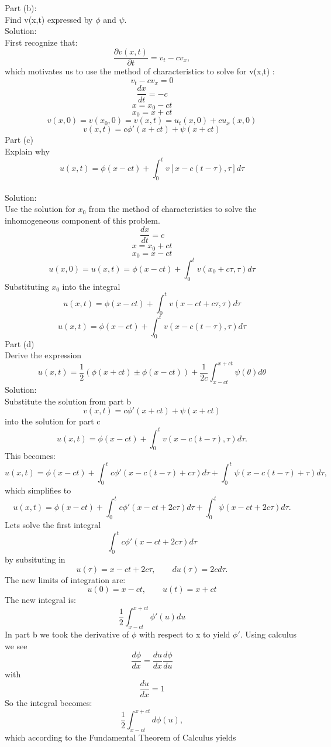 \documentclass{article}
\begin{document}
Part (b):\\
 Find v(x,t) expressed by $\phi$ and $\psi$.\\
Solution:\\
First recognize that:\\
\[ \frac{\partial v(x,t) }{\partial t} = v_{t} - cv_{x},\]
which motivates us to use the method of characteristics to solve for v(x,t)  :\\
\[ v_{t} - cv_{x}=0\]
\[ \frac{dx}{dt} = -c\]
\[ x = x_{0} -ct\]
\[x_{0} = x + ct\]
\[ v(x,0) = v(x_{0},0) = v(x,t)= u_{t}(x,0) + cu_{x}(x,0)\]
\[ v(x,t) = c\phi ' (x+ct) + \psi(x+ct) \]
Part (c)\\
Explain why
\[ u(x,t) = \phi(x-ct) + \int_{0}^{t} v[x-c(t-\tau),\tau]d\tau\]
\\
Solution:\\
Use the solution for $x_{0}$ from the method of characteristics to solve the inhomogeneous component of this problem.
\[\frac{dx}{dt} = c\]
\[ x = x_{0} +ct\]
\[ x_{0} = x-ct\]
\[u(x,0)= u(x,t) = \phi(x-ct) + \int_{0}^{t}v(x_{0}+c\tau, \tau) d\tau\]
Substituting $ x_{0}$ into the integral\\
\[u(x,t) = \phi(x-ct) + \int_{0}^{t}v(x - ct + c\tau,\tau)d\tau\]
\[u(x,t) = \phi(x-ct) + \int_{0}^{t}v(x-c(t-\tau),\tau)  d\tau\]
Part (d)\\
Derive the expression\\
\[ u(x,t) = \frac{1}{2}(\phi(x+ct) \pm \phi(x-ct)) +\frac{1}{2c}\int_{x-ct}^{x+ct}\psi(\theta)d\theta\]
Solution:\\
Substitute the solution from part b
\[ v(x,t) = c\phi ' (x+ct) + \psi(x+ct) \]
into the solution for part c\\
\[u(x,t) = \phi(x-ct) + \int_{0}^{t}v(x-c(t-\tau),\tau)  d\tau.\]
This becomes:
\[ u(x,t) = \phi(x-ct) + \int_{0}^{t}c\phi'(x-c(t-\tau) +c\tau)d\tau + \int_{0}^{t}\psi(x-c(t-\tau)+\tau)d\tau,\]
which simplifies to
\[ u(x,t) = \phi(x-ct) + \int_{0}^{t}c\phi'(x-ct +2c\tau)d\tau + \int_{0}^{t}\psi(x-ct+2c\tau)d\tau.\]
Lets solve the first integral
\[\int_{0}^{t}c\phi'(x-ct +2c\tau)d\tau\]
by subsituting in
\[ u(\tau) = x -ct + 2c\tau, \qquad du(\tau) = 2cd\tau. \]
The new limits of integration are:
\[u(0) = x - ct, \qquad u(t) = x + ct\]
The new integral is:
\[\frac{1}{2}\int_{x-ct}^{x+ct}\phi'(u)du\]
In part b we took the derivative of $\phi$ with respect to x to yield $\phi'$. Using calculus we see
\[\frac{d\phi}{dx} = \frac{du}{dx}\frac{d\phi}{du}\]
with
\[\frac{du}{dx} = 1\]
So the integral becomes:
\[\frac{1}{2}\int_{x-ct}^{x+ct}d\phi(u),\]
which according to the Fundamental Theorem of Calculus yields
\end{document}

